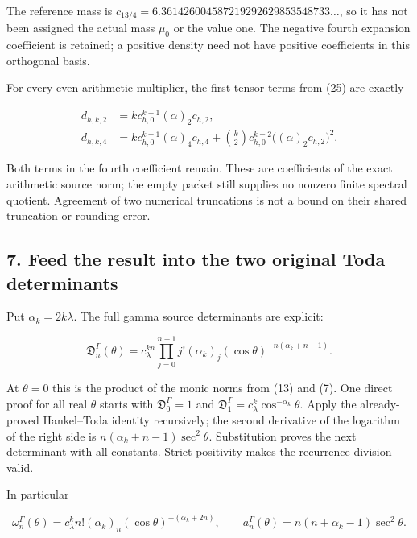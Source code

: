 The reference mass is \(c_{13/4}=6.361426004587219292629853548733\ldots\), so it has not been
assigned the actual mass \(\mu_0\) or the value one. The negative fourth expansion coefficient is
retained; a positive density need not have positive coefficients in this orthogonal basis.

For every even arithmetic multiplier, the first tensor terms from (25) are exactly

\[
\begin{aligned}
d_{h,k,2}&=k c_{h,0}^{k-1}(\alpha)_2c_{h,2},\\
d_{h,k,4}&=k c_{h,0}^{k-1}(\alpha)_4c_{h,4}
 +\binom{k}{2}c_{h,0}^{k-2}\bigl((\alpha)_2c_{h,2}\bigr)^2.
\end{aligned}
\]

Both terms in the fourth coefficient remain. These are coefficients of the exact arithmetic source
norm; the empty packet still supplies no nonzero finite spectral quotient. Agreement of two
numerical truncations is not a bound on their shared truncation or rounding error.

\subsection{7. Feed the result into the two original Toda
determinants}\label{gamma_convolution:feed-the-result-into-the-two-original-toda-determinants}

Put \(\alpha_k=2k\lambda\). The full gamma source determinants are explicit:

\[
\boxed{
\mathfrak D_n^\Gamma(\theta)
=c_\lambda^{kn}
\prod_{j=0}^{n-1}j!(\alpha_k)_j
(\cos\theta)^{-n(\alpha_k+n-1)}.
}                                                                   \tag{28}
\]

At \(\theta=0\) this is the product of the monic norms from (13) and (7). One direct proof for all
real \(\theta\) starts with \(\mathfrak D_0^\Gamma=1\) and
\(\mathfrak D_1^\Gamma=c_\lambda^k\cos^{-\alpha_k}\theta\). Apply the already-proved Hankel--Toda
identity recursively; the second derivative of the logarithm of the right side is
\(n(\alpha_k+n-1)\sec^2\theta\). Substitution proves the next determinant with all constants. Strict
positivity makes the recurrence division valid.

In particular

\[
\omega_n^\Gamma(\theta)
=c_\lambda^k n!(\alpha_k)_n(\cos\theta)^{-(\alpha_k+2n)},\qquad
 a_n^\Gamma(\theta)=n(n+\alpha_k-1)\sec^2\theta.                     \tag{29}
\]


